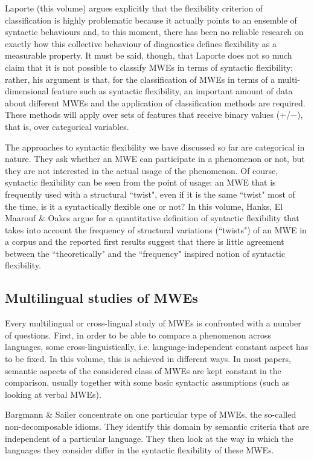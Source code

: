 \documentclass[output=paper]{langsci/langscibook}
\begin{document}
Laporte (this volume) argues explicitly that the flexibility criterion of classification is highly problematic because it actually points to an ensemble of syntactic behaviours and, to this moment, there has been no reliable research on exactly how this collective behaviour of diagnostics defines flexibility as a measurable property. It must be said, though, that Laporte does not so much claim that it is not possible to classify MWEs in terms of syntactic flexibility; rather, his argument is that, for the classification of MWEs in terms of a multi-dimensional feature such as syntactic flexibility, an important amount of data about different MWEs and the application of classification methods are required. These methods will apply over sets of features that receive binary values ($+$/$-$), that is, over categorical variables. 

The approaches to syntactic flexibility we have discussed so far are categorical in nature. They ask whether an MWE can participate in a phenomenon or not, but they are not interested in the actual usage of the phenomenon. Of course, syntactic flexibility can be seen from the point of usage: an MWE that is frequently used with a structural ``twist", even if it is the same ``twist" most of the time, is it a syntactically flexible one or not? In this volume, Hanks, El Maarouf \& Oakes argue for a quantitative definition of syntactic flexibility that takes into account the frequency of structural variations (``twists") of an MWE in a corpus and the reported first results suggest that there is little agreement between the ``theoretically" and the ``frequency" inspired notion of syntactic flexibility. 

\subsection{Multilingual studies of MWEs}\label{Sec-Multiling}

Every multilingual or cross-lingual study of MWEs is confronted with a number of questions. First, in order to be able to compare a phenomenon across languages, some cross-linguistically, i.e. language-independent constant aspect has to be fixed. In this volume, this is achieved in different ways. In most papers, semantic aspects of the considered class of MWEs are kept constant in the comparison, usually together with some basic syntactic assumptions (such as looking at verbal MWEs).  

Bargmann \& Sailer concentrate on one particular type of MWEs, the so-called non-de\-com\-posable idioms. They identify this domain by semantic criteria that are independent of a particular language. They then look at the way in which the languages they consider differ in the syntactic flexibility of these MWEs.
\end{document}
